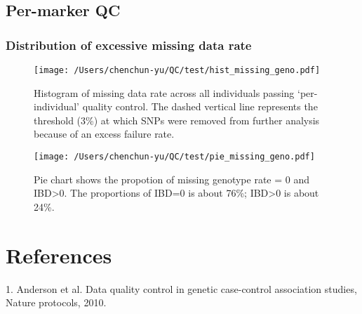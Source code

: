 \documentclass{article}\usepackage[]{graphicx}\usepackage[]{color}
\begin{document}
\subsection{Per-marker QC}
\subsubsection{Distribution of excessive missing data rate}
\newpage
\begin{figure}[h]
\texttt{[image: /Users/chenchun-yu/QC/test/hist\_missing\_geno.pdf]}
\centering
\caption{Histogram of missing data rate across all individuals passing ‘per-individual’ quality control. The dashed vertical line represents the threshold (3\%) at which SNPs were removed from further analysis because of an excess failure rate.}
\end{figure}
\newpage
\begin{figure}[h]
\texttt{[image: /Users/chenchun-yu/QC/test/pie\_missing\_geno.pdf]}
\centering
\caption{Pie chart shows the propotion of missing genotype rate = 0 and IBD\textgreater 0. The proportions of IBD=0 is about 76\%; IBD\textgreater 0 is about 24\%.}
\end{figure}
\section{References}
1. Anderson et al. Data quality control in genetic case-control association studies, Nature protocols, 2010.
\end{document}
